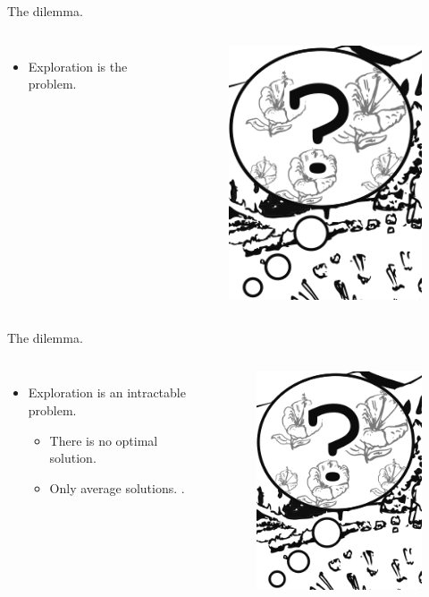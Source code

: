 \documentclass[10pt]{beamer}
\begin{document}
\begin{frame}[fragile]{The dilemma.}
\begin{columns}
\centering
\begin{itemize}
    \item Exploration is the problem.
\end{itemize}

\centering
\begin{figure}
    \centering
    \includegraphics[scale=1.5]{images/bee_explore.png} 
    \caption{}
\end{figure}
\end{columns}
\end{frame}

\begin{frame}[fragile]{The dilemma.}
\begin{columns}
\centering
\begin{itemize}
    \item Exploration is an intractable problem.
    \begin{itemize}
    \item There is no optimal solution.
    \item Only average solutions. \cite{Thrun1992a,Dayan1996,Findling2018,Gershman2018b}.
    \end{itemize}
\end{itemize}

\centering
\begin{figure}
    \centering
    \includegraphics[scale=1.5]{images/bee_explore.png} 
    \caption{}
\end{figure}
\end{columns}
\end{frame}
\end{document}
